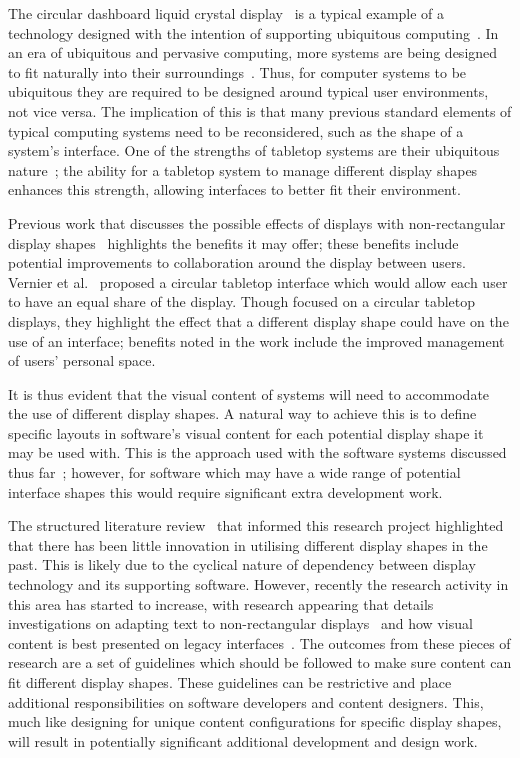 \documentclass[twocolumn,compsoc]{cvm}
\begin{document}
The circular dashboard liquid crystal display~\cite{Boyd2007} is a typical example of a technology designed with the intention of supporting ubiquitous computing~\cite{Weiser1999}.
In an era of ubiquitous and pervasive computing, more systems are being designed to fit naturally into their surroundings~\cite{Greenfield2006}.
Thus, for computer systems to be ubiquitous they are required to be designed around typical user environments, not vice versa.
The implication of this is that many previous standard elements of typical computing systems need to be reconsidered, such as the shape of a system's interface.
One of the strengths of tabletop systems are their ubiquitous nature~\cite{Smith2012}; the ability for a tabletop system to manage different display shapes enhances this strength, allowing interfaces to better fit their environment.

Previous work that discusses the possible effects of displays with non-rectangular display shapes~\cite{Vernier2002} highlights the benefits it may offer; these benefits include potential improvements to collaboration around the display between users.
Vernier et al.~\cite{Vernier2002} proposed a circular tabletop interface which would allow each user to have an equal share of the display.
Though focused on a circular tabletop displays, they highlight the effect that a different display shape could have on the use of an interface; benefits noted in the work include the improved management of users' personal space.

It is thus evident that the visual content of systems will need to accommodate the use of different display shapes.
A natural way to achieve this is to define specific layouts in software's visual content for each potential display shape it may be used with.
This is the approach used with the software systems discussed thus far~\cite{Hansen2009,Shen2004}; however, for software which may have a wide range of potential interface shapes this would require significant extra development work.

The structured literature review~\cite{Kitchenham2004} that informed this research project highlighted that there has been little innovation in utilising different display shapes in the past.
This is likely due to the cyclical nature of dependency between display technology and its supporting software.
However, recently the research activity in this area has started to increase, with research appearing that details investigations on adapting text to non-rectangular displays~\cite{Serrano2016} and how visual content is best presented on legacy interfaces~\cite{Serrano2017}.
The outcomes from these pieces of research are a set of guidelines which should be followed to make sure content can fit different display shapes.
These guidelines can be restrictive and  place additional responsibilities on software developers and content designers.
This, much like designing for unique content configurations for specific display shapes, will result in potentially significant additional development and design work.
\end{document}
